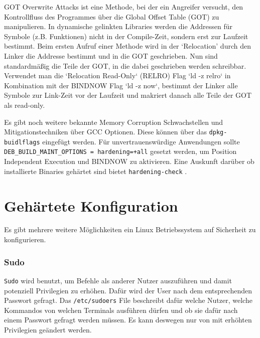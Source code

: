 
GOT Overwrite Attacks ist eine Methode, bei der ein Angreifer versucht, den Kontrollfluss des Programmes über die Global Offset Table (GOT) zu manipulieren. In dynamische gelinkten Libraries werden die Addressen für Symbole (z.B. Funktionen) nicht in der Compile-Zeit, sondern erst zur Laufzeit bestimmt. Beim ersten Aufruf einer Methode wird in der `Relocation' durch den Linker die Addresse bestimmt und in die GOT geschrieben. Nun sind standardmäßig die Teile der GOT, in die dabei geschrieben werden schreibbar. 
Verwendet man die `Relocation Read-Only` (RELRO) Flag `ld -z relro` in Kombination mit der BINDNOW Flag `ld -z now`, bestimmt der Linker alle Symbole zur Link-Zeit vor der Laufzeit und makriert danach alle Teile der GOT als read-only. \cite{relro}

Es gibt noch weitere bekannte Memory Corruption Schwachstellen und Mitigationstechniken über GCC Optionen. Diese können über das \texttt{dpkg-buidlflags} eingefügt werden. Für unvertrauenswürdige Anwendungen sollte \texttt{DEB\_BUILD\_MAINT\_OPTIONS = hardening=+all} gesetzt werden, um Position Independent Execution und BINDNOW zu aktivieren. Eine Auskunft darüber ob installierte Binaries gehärtet sind bietet \texttt{hardening-check} \cite{debian-hardening}. 


\section{Gehärtete Konfiguration}

Es gibt mehrere weitere Möglichkeiten ein Linux Betriebssystem auf Sicherheit zu konfigurieren.

\subsubsection{Sudo}

\texttt{Sudo} wird benutzt, um Befehle als anderer Nutzer auszuführen und damit potenziell Privilegien zu erhöhen. Dafür wird der User nach dem entsprechenden Passwort gefragt. Das \texttt{/etc/sudoers} File beschreibt dafür welche Nutzer, welche Kommandos von welchen Terminals ausführen dürfen und ob sie dafür nach einem Passwort gefragt werden müssen. Es kann deswegen nur von mit erhöhten Privilegien geändert werden. \cite{man-sudo}

